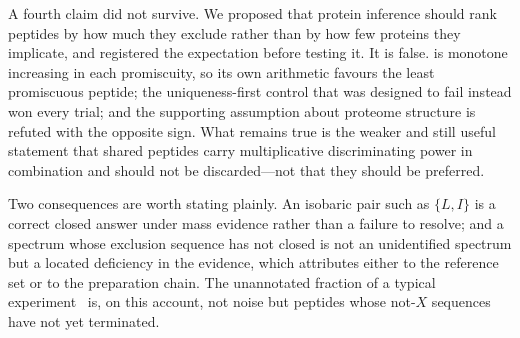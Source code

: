 \documentclass[11pt,a4paper]{article}
\theoremstyle{definition}
\theoremstyle{remark}
\begin{document}
A fourth claim did not survive. We proposed that protein inference should
rank peptides by how much they exclude rather than by how few proteins
they implicate, and registered the expectation before testing it. It is
false.  is monotone increasing in each promiscuity, so
its own arithmetic favours the least promiscuous peptide; the
uniqueness-first control that was designed to fail instead won every
trial; and the supporting assumption about proteome structure is refuted
with the opposite sign. What remains true is the weaker and still useful
statement that shared peptides carry multiplicative discriminating power
in combination and should not be discarded---not that they should be
preferred.

Two consequences are worth stating plainly. An isobaric pair such as
$\{L,I\}$ is a correct closed answer under mass evidence rather than a
failure to resolve; and a spectrum whose exclusion sequence has not
closed is not an unidentified spectrum but a located deficiency in the
evidence, which  attributes either to the reference
set or to the preparation chain. The unannotated fraction of a typical
experiment~\citep{michalski2011more} is, on this account, not noise but
peptides whose not-$X$ sequences have not yet terminated.



\end{document}
